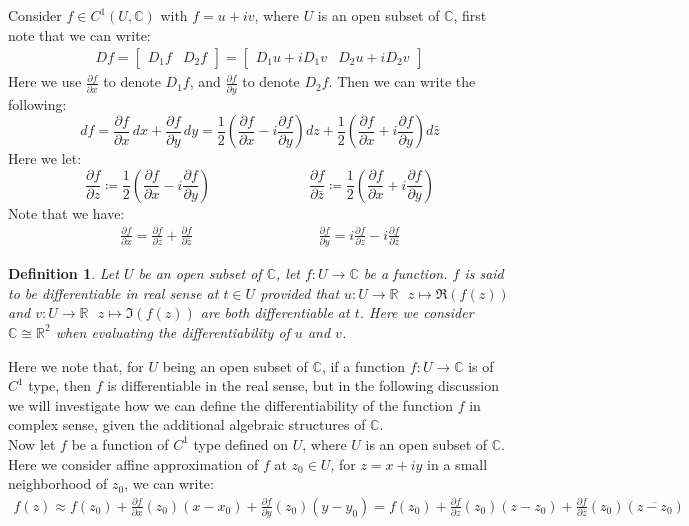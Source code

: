 \documentclass[11pt,oneside]{book}
\theoremstyle{break}
\theoremstyle{break}
\newtheorem{defn}{Definition}[corL]
\newcommand{\R}{\mathbb{R}}
\newcommand{\Complex}{\mathbb{C}}
\newcommand{\pd}{\partial}
\newcommand{\bmat}[1]{\begin{bmatrix} #1 \end{bmatrix}}
\begin{document}
Consider $f \in C^1(U, \Complex)$ with $f= u+iv$, where $U$ is an open subset of $\Complex$, first note that we can write:
\begin{align*}
Df = \bmat{D_1f & D_2f} = \bmat{D_1u + iD_1v & D_2u+iD_2v}
\end{align*}
Here we use $\frac{\partial f}{\partial x}$ to denote $D_1f$, and $\frac{\partial f}{\partial y}$ to denote $D_2f$. Then we can write the following:
$$df = \frac{\partial f}{\partial x}\, dx +\frac{\partial f}{\partial y}\, dy = \frac{1}{2}\left( \frac{\partial f}{\partial x}-i \frac{\partial f}{\partial y}\right) dz + \frac{1}{2}\left( \frac{\partial f}{\partial x}+i \frac{\partial f}{\partial y}\right) d\bar{z}$$
Here we let:
$$\frac{\partial f}{\partial z}\coloneqq \frac{1}{2}\left( \frac{\partial f}{\partial x}-i \frac{\partial f}{\partial y}\right)\qquad\qquad\qquad\quad\frac{\partial f}{\partial \bar{z}}\coloneqq \frac{1}{2}\left( \frac{\partial f}{\partial x}+i \frac{\partial f}{\partial y}\right)$$ Note that we have:
\begin{align*}
\frac{\partial f}{\partial x} = \frac{\pd f}{\pd z}+ \frac{\pd f}{\pd \bar{z}}\qquad\qquad\qquad\qquad\quad
\frac{\pd f}{\pd y}= i \frac{\pd f}{\pd z} - i \frac{\pd f}{\pd \bar{z}}
\end{align*}


\hfill\break
\begin{defn}
Let $U$ be an open subset of $\Complex$, let $f:U \to \Complex$ be a function. $f$ is said to be differentiable in real sense at $t \in U$ provided that $u:U \to \R \ \ \ z\mapsto\Re(f(z))$ and $v:U \to \R \ \ \ z\mapsto\Im(f(z))$ are both differentiable at $t$. Here we consider $\Complex \cong \R^2$ when evaluating the differentiability of $u$ and $v$.  
\end{defn}
\hfill\break
Here we note that, for $U$ being an open subset of $\Complex$, if a function $f:U \to \Complex$ is of $C^1$ type, then $f$ is differentiable in the real sense, but in the following discussion we will investigate how we can define the differentiability of the function $f$ in complex sense, given the additional algebraic structures of $\Complex$.\\

Now let $f$ be a function of $C^1$ type defined on $U$, where $U$ is an open subset of $\Complex$. Here we consider affine approximation of $f$ at $z_0 \in U$, for $z = x+iy$ in a small neighborhood of $z_0$, we can write:
\begin{align*}
f(z) \approx f(z_0) + \frac{\pd f}{\pd x}(z_0)(x-x_0) +\frac{\pd f}{\pd y}(z_0)(y-y_0) = f(z_0) + \frac{\pd f}{\pd z}(z_0)(z-z_0) + \frac{\pd f}{\pd \bar{z}}(z_0)(\overline{z-z_0})
\end{align*}
\end{document}
